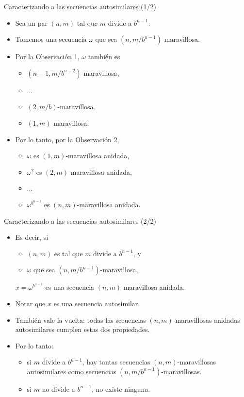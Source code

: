 \documentclass[spanish,xcolor={table}]{beamer}
\begin{document}
\begin{frame}{Caracterizando a las secuencias autosimilares (1/2)}

\begin{itemize}
  \item Sea un par $(n,m)$ tal que $m$ divide a $b^{n-1}$.
  \item Tomemos una secuencia $\omega$ que sea $(n, m/b^{n-1})$-maravillosa.
  \item Por la Observación 1, $\omega$ también es
  \begin{itemize}
    \item $(n-1, m/b^{n-2})$-maravillosa,
    \item ...
    \item $(2, m/b)$-maravillosa.
    \item $(1, m)$-maravillosa.
  \end{itemize}
  \item Por lo tanto, por la Observación 2,
  \begin{itemize}
    \item $\omega$ es $(1, m)$-maravillosa anidada,
    \item $\omega^2$ es $(2, m)$-maravillosa anidada,
    \item ...
    \item $\omega^{b^{n-1}}$ es $(n, m)$-maravillosa anidada.
  \end{itemize}
\end{itemize}

\end{frame}


\begin{frame}{Caracterizando a las secuencias autosimilares (2/2)}

  \begin{itemize}
    \item Es decir, si
    \begin{itemize}
      \item $(n,m)$ es tal que $m$ divide a $b^{n-1}$, y
      \item $\omega$ que sea $(n, m/b^{n-1})$-maravillosa,
    \end{itemize}
    $x = \omega^{b^{n-1}}$ es una secuencia $(n,m)$-maravillosa anidada.
    \item Notar que $x$ es una secuencia autosimilar.
    \item También vale la vuelta: todas las secuencias $(n,m)$-maravillosas
    anidadas autosimilares cumplen estas dos propiedades.
    \item Por lo tanto:
    \begin{itemize}
      \item si $m$ divide a $b^{n-1}$, hay tantas secuencias
      $(n,m)$-maravillosas autosimilares como secuencias $(n, m/b^{n-1})$-maravillosas.
      \item si $m$ no divide a $b^{n-1}$, no existe ninguna.
    \end{itemize}
    
  \end{itemize}
  
  \end{frame}
\end{document}

